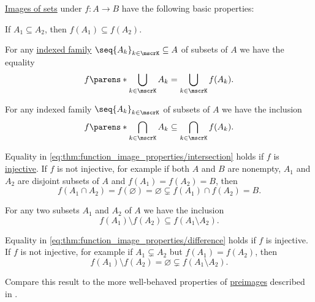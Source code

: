 \begin{proposition}\label{thm:function_image_properties}
  \hyperref[def:multi_valued_function/set_value]{Images of sets} under \( f: A \to B \) have the following basic properties:
  \begin{thmenum}
     If \( A_1 \subseteq A_2 \), then \( f(A_1) \subseteq f(A_2) \).

     For any \hyperref[def:indexed_family]{indexed family} \( \seq{ A_k }_{k \in \mscrK} \subseteq A \) of subsets of \( A \) we have the equality
    \begin{equation}\label{eq:thm:function_image_properties/union}
      f\parens*{ \bigcup_{k \in \mscrK} A_k } = \bigcup_{k \in \mscrK} f(A_k).
    \end{equation}

     For any indexed family \( \seq{ A_k }_{k \in \mscrK} \) of subsets of \( A \) we have the inclusion
    \begin{equation}\label{eq:thm:function_image_properties/intersection}
      f\parens*{ \bigcap_{k \in \mscrK} A_k } \subseteq \bigcap_{k \in \mscrK} f(A_k).
    \end{equation}

    Equality in \eqref{eq:thm:function_image_properties/intersection} holds if \( f \) is \hyperref[def:function_invertibility/injective]{injective}. If \( f \) is not injective, for example if both \( A \) and \( B \) are nonempty, \( A_1 \) and \( A_2 \) are disjoint subsets of \( A \) and \( f(A_1) = f(A_2) = B \), then
    \begin{equation*}
      f(A_1 \cap A_2) = f(\varnothing) = \varnothing \subsetneq f(A_1) \cap f(A_2) = B.
    \end{equation*}

     For any two subsets \( A_1 \) and \( A_2 \) of \( A \) we have the inclusion
    \begin{equation}\label{eq:thm:function_image_properties/difference}
      f(A_1) \setminus f(A_2) \subseteq f(A_1 \setminus A_2).
    \end{equation}

    Equality in \eqref{eq:thm:function_image_properties/difference} holds if \( f \) is injective. If \( f \) is not injective, for example if \( A_1 \subsetneq A_2 \) but \( f(A_1) = f(A_2) \), then
    \begin{equation*}
      f(A_1) \setminus f(A_2) = \varnothing \subsetneq f(A_1 \setminus A_2).
    \end{equation*}
  \end{thmenum}

  Compare this result to the more well-behaved properties of \hyperref[thm:function_properties/preimage]{preimages} described in .
\end{proposition}
